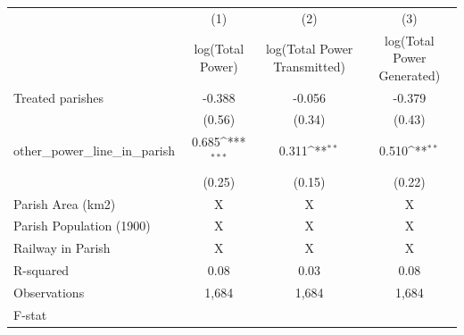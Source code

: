 {
\def\sym#1{\ifmmode^{#1}\else\(^{#1}\)\fi}
\begin{tabular}{l*{3}{c}}
\hline\hline
                    &\multicolumn{1}{c}{(1)}         &\multicolumn{1}{c}{(2)}         &\multicolumn{1}{c}{(3)}         \\
                    &log(Total Power)         &log(Total Power Transmitted)         &log(Total Power Generated)         \\
\hline
Treated parishes    &      -0.388         &      -0.056         &      -0.379         \\
                    &      (0.56)         &      (0.34)         &      (0.43)         \\
other\_power\_line\_in\_parish&       0.685\sym{***}&       0.311\sym{**} &       0.510\sym{**} \\
                    &      (0.25)         &      (0.15)         &      (0.22)         \\
\hline
Parish Area (km2)   &           X         &           X         &           X         \\
Parish Population (1900)&           X         &           X         &           X         \\
Railway in Parish   &           X         &           X         &           X         \\
R-squared           &        0.08         &        0.03         &        0.08         \\
Observations        &       1,684         &       1,684         &       1,684         \\
F-stat              &                     &                     &                     \\
\hline\hline
\end{tabular}
}
